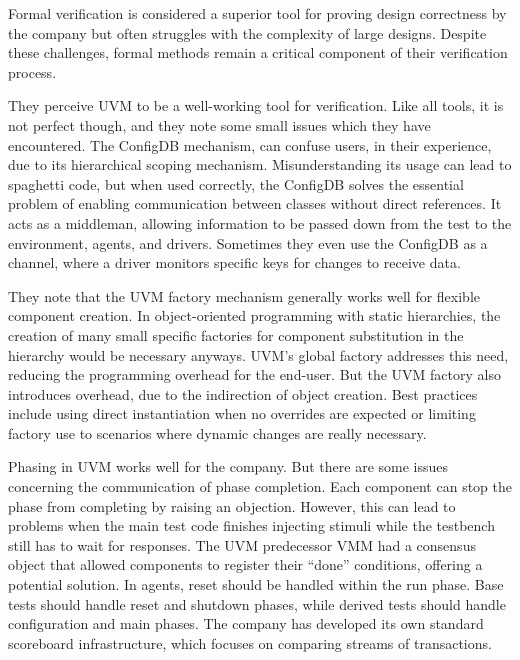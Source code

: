 \documentclass[11pt,a4paper]{report}
\begin{document}
Formal verification is considered a superior tool for proving design correctness by the company but often struggles with the
complexity of large designs. Despite these challenges, formal methods remain a critical component of their verification process.

They perceive UVM to be a well-working tool for verification. Like all tools, it is not perfect though, and they note
some small issues which they have encountered. The ConfigDB mechanism, can confuse users, in their experience, due to its
hierarchical scoping mechanism. Misunderstanding its usage can lead to spaghetti code, but when used correctly, the
ConfigDB solves the essential problem of enabling communication between classes without direct references. It acts as
a middleman, allowing information to be passed down from the test to the environment, agents, and drivers. Sometimes
they even use the ConfigDB as a channel, where a driver monitors specific keys for changes to receive data.

They note that the UVM factory mechanism generally works well for flexible component creation. In object-oriented
programming with static hierarchies, the creation of many small specific factories for component substitution in the
hierarchy would be necessary anyways. UVM's global factory addresses this need, reducing the programming overhead for
the end-user. But the UVM factory also introduces overhead, due to the indirection of object creation. Best practices
include using direct instantiation when no overrides are expected or limiting factory use to scenarios where dynamic
changes are really necessary.

Phasing in UVM works well for the company. But there are some issues concerning the communication of phase
completion. Each component can stop the phase from completing by raising an objection. However, this can lead to
problems when the main test code finishes injecting stimuli while the testbench still has to wait for responses. The
UVM predecessor VMM had a consensus object that allowed components to register their “done” conditions, offering a potential
solution. In agents, reset should be handled within the run phase. Base tests should handle reset and shutdown
phases, while derived tests should handle configuration and main phases. The company has developed its own standard
scoreboard infrastructure, which focuses on comparing streams of transactions.
\end{document}

